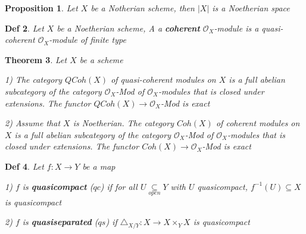 \documentclass{article}
\newtheorem{theorem}{Theorem}[section]
\newtheorem{definition}[theorem]{Def}
\newtheorem{proposition}[theorem]{Proposition}
\begin{document}
\begin{proposition}
    Let $X$ be a Notherian scheme, then $|X|$ is a Noetherian space
\end{proposition}

\begin{definition}
    Let $X$ be a Noetherian scheme, A a \textbf{coherent} $\mathcal O_X$-module is a quasi-coherent $\mathcal O_X$-module of finite type
\end{definition}

\begin{theorem}
    Let $X$ be a scheme
    
1) The category $QCoh(X)$ of quasi-coherent modules on $X$ is a full abelian subcategory
of the category $\mathcal O_X$-Mod of $\mathcal O_X$-modules that is closed under extensions. The functor
$QCoh(X) \to\mathcal O_X$-Mod is exact

2) Assume that $X$ is Noetherian. 
The category $Coh(X)$ of coherent modules on $X$ is a full abelian subcategory
of the category $\mathcal O_X$-Mod of $\mathcal O_X$-modules that is closed under extensions. The functor
$Coh(X) \to\mathcal O_X$-Mod is exact
\end{theorem}

\begin{definition}
    Let $f:X\to Y$ be a map

    1) $f$ is \textbf{quasicompact} ($qc$) if for all $U\mathop{\subseteq}\limits_{open} Y$ with $U$ quasicompact, $f^{-1}(U)\subseteq X$ is quasicompact

    2) $f$ is \textbf{quasiseparated} ($qs$) if $\triangle_{X/Y}:X\to X\times_Y X$ is quasicompact
\end{definition}
\end{document}
